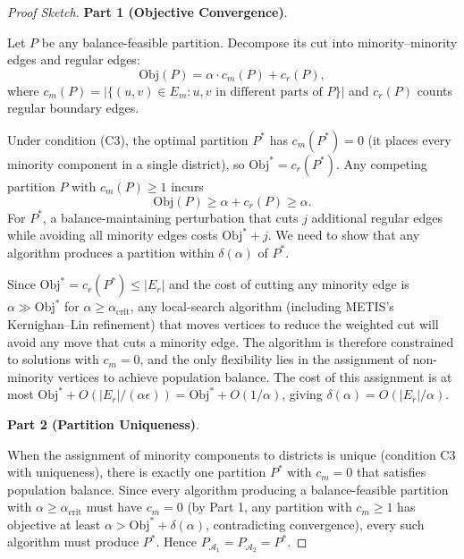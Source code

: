 \begin{proof}[Proof Sketch]
\textbf{Part 1 (Objective Convergence)}.

Let $P$ be any balance-feasible partition. Decompose its cut into minority--minority edges and regular edges:
\[
    \mathrm{Obj}(P) = \alpha \cdot c_m(P) + c_r(P),
\]
where $c_m(P) = |\{(u,v)\in E_m : u,v \text{ in different parts of } P\}|$ and $c_r(P)$ counts regular boundary edges.

Under condition (C3), the optimal partition $P^*$ has $c_m(P^*) = 0$ (it places every minority component in a single district), so $\mathrm{Obj}^* = c_r(P^*)$. Any competing partition $P$ with $c_m(P) \geq 1$ incurs
\[
    \mathrm{Obj}(P) \geq \alpha + c_r(P) \geq \alpha.
\]
For $P^*$, a balance-maintaining perturbation that cuts $j$ additional regular edges while avoiding all minority edges costs $\mathrm{Obj}^* + j$. We need to show that any algorithm produces a partition within $\delta(\alpha)$ of $P^*$.

Since $\mathrm{Obj}^* = c_r(P^*) \leq |E_r|$ and the cost of cutting any minority edge is $\alpha \gg \mathrm{Obj}^*$ for $\alpha \geq \alpha_{\text{crit}}$, any local-search algorithm (including METIS's Kernighan--Lin refinement) that moves vertices to reduce the weighted cut will avoid any move that cuts a minority edge. The algorithm is therefore constrained to solutions with $c_m = 0$, and the only flexibility lies in the assignment of non-minority vertices to achieve population balance. The cost of this assignment is at most $\mathrm{Obj}^* + O(|E_r|/(\alpha\epsilon)) = \mathrm{Obj}^* + O(1/\alpha)$, giving $\delta(\alpha) = O(|E_r|/\alpha)$.

\textbf{Part 2 (Partition Uniqueness)}.

When the assignment of minority components to districts is unique (condition C3 with uniqueness), there is exactly one partition $P^*$ with $c_m = 0$ that satisfies population balance. Since every algorithm producing a balance-feasible partition with $\alpha \geq \alpha_{\text{crit}}$ must have $c_m = 0$ (by Part 1, any partition with $c_m \geq 1$ has objective at least $\alpha > \mathrm{Obj}^* + \delta(\alpha)$, contradicting convergence), every such algorithm must produce $P^*$. Hence $P_{\mathcal{A}_1} = P_{\mathcal{A}_2} = P^*$.
\end{proof}

